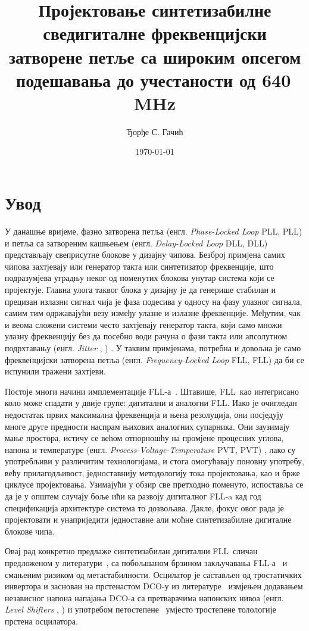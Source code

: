 \documentclass[master]{finthesis}
\title{Пројектовање синтетизабилне сведигиталне фреквенцијски затворене петље са широким опсегом подешавања до учестаности од 640\texorpdfstring{\,}{ }MHz}
\author{Ђорђе С. Гачић}
\date{\today}
\makeatletter
\newcommand*{\engl}[2][\@empty]{%
    \edef\theacronym{#1}%
    (енгл. \foreignlanguage{english}{\emph{#2}%
    \ifx\theacronym\@empty \else , #1\fi})%
}
\def \FLL  {FLL} %
\def \DCO  {DCO} %
\makeatother
\begin{document}
\maketitle

\tableofcontents

\makeabstract

\section{Увод}
У данашње вријеме, фазно затворена петља \engl[PLL]{Phase-Locked Loop} и петља са затвореним кашњењем \engl[DLL]{Delay-Locked Loop} представљају свеприсутне блокове у дизајну чипова. Безброј примјена самих чипова захтјевају или генератор такта или синтетизатор фреквенције, што подразумјева уградњу неког од поменутих блокова унутар система који се пројектује. Главна улога таквог блока у дизајну је да генерише стабилан и прецизан излазни сигнал чија је фаза подесива у односу на фазу улазног сигнала, самим тим одржавајући везу између улазне и излазне фреквенције. Међутим, чак и веома сложени системи често захтјевају генератор такта, који само множи улазну фреквенцију без да посебно води рачуна о фази такта или апсолутном подрхтавању \engl{Jitter}. У таквим примјенама, потребна и довољна је само фреквенцијски затворена петља \engl[FLL]{Frequency-Locked Loop} да би се испунили тражени захтјеви. \par
Постоје многи начини имплементације \FLL-а~\cite{Ali:9097205}. Штавише, \FLL\ као интегрисано коло може спадати у двије групе: дигитални и аналогни \FLL. Иако је очигледан недостатак првих максимална фреквенција и њена резолуција, они посједују многе друге предности наспрам њихових аналогних супарника. Они заузимају мање простора, истичу се већом отпорношћу на промјене процесних углова, напона и температуре \engl[PVT]{Process-Voltage-Temperature}, лако су употребљиви у различитим технологијама, и стога омогућавају поновну употребу, већу прилагодљивост, једноставнију методологију тока пројектовања, као и брже циклусе пројектовања. Узимајући у обзир све претходно поменуто, испоставља се да је у општем случају боље ићи ка развоју дигиталног \FLL-a кад год спецификација архитектуре система то дозвољава. Дакле, фокус овог рада је пројектовати и унаприједити једноставне али моћне синтетизабилне дигиталне блокове чипа. \par
Овај рад конкретно предлаже синтетизабилан дигитални \FLL\ сличан предложеном у литератури~\cite{Musa:6644316}, са побољшаном брзином закључавања \FLL-а~\cite{Deng:6891375} и смањеним ризиком од метастабилности. Осцилатор је састављен од тростатичких инвертора и заснован на прстенастом \DCO-у из литературе~\cite{Tierno:4443210} измјењен додавањем независног напона напајања \DCO-а са претварачима напонских нивоа \engl{Level Shifters} и употребом петостепене~\cite{Rylyakov:4523284} умјесто тростепене толологије прстена осцилатора. \par
\end{document}

